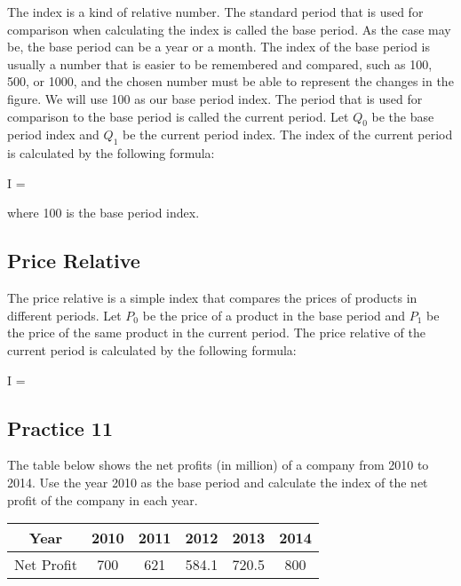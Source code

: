 \documentclass{report}
\begin{document}
\begin{multicols}{2}
  The index is a kind of relative number. The standard period that is used for
  comparison when calculating the index is called the base period. As the case
  may be, the base period can be a year or a month. The index of the base period
  is usually a number that is easier to be remembered and compared, such as 100,
  500, or 1000, and the chosen number must be able to represent the changes in
  the figure. We will use 100 as our base period index. The period that is used
  for comparison to the base period is called the current period. Let $Q_0$ be
  the base period index and $Q_1$ be the current period index. The index of the
  current period is calculated by the following formula:

  \begin{cequation}
    I =  
  \end{cequation}

  \noindent where 100 is the base period index.

  \subsection*{Price Relative}

  The price relative is a simple index that compares the prices of products in
  different periods. Let $P_0$ be the price of a product in the base period and
  $P_1$ be the price of the same product in the current period. The price
  relative of the current period is calculated by the following formula:

  \begin{cequation}
    I =  
  \end{cequation}

  \subsection{Practice 11}

  The table below shows the net profits (in million) of a company from 2010 to
  2014. Use the year 2010 as the base period and calculate the index of the net
  profit of the company in each year.
  \begin{center}
    \begin{tabular}{|c|c|c|c|c|c|}
      \hline
      Year       & 2010 & 2011 & 2012  & 2013  & 2014 \\
      \hline
      Net Profit & 700  & 621  & 584.1 & 720.5 & 800  \\
      \hline
    \end{tabular}
  \end{center}


\end{multicols}
\end{document}
